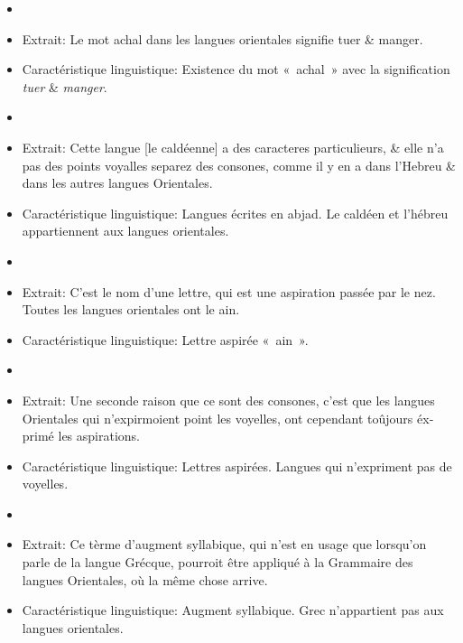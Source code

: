 \documentclass[output=paper,colorlinks,citecolor=brown,arabicfont,chinesefont,booklanguage=french]{langscibook}
\begin{document}
\begin{otherlanguage}{french}
\begin{description}[font=\normalfont]
\item[ACHAL] 
    \begin{itemize}[leftmargin=*]
        \item[]
        \item Extrait: Le mot achal dans les langues orientales signifie tuer \& manger. 
        \item Caractéristique linguistique: Existence du mot «~achal~» avec la signification \emph{tuer} \& \emph{manger}.
    \end{itemize}        
\item[ABYSSINS] 
    \begin{itemize}[leftmargin=*]
        \item[]
        \item Extrait: Cette langue [le caldéenne] a des caracteres particulieurs, \& elle n’a pas des points voyalles separez des consones, comme il y en a dans l’Hebreu \& dans les autres langues Orientales. 
        \item Caractéristique linguistique: Langues écrites en abjad. Le caldéen et l’hébreu appartiennent aux langues orientales.
    \end{itemize}        
\item[AIN] 
    \begin{itemize}[leftmargin=*]
        \item[]
        \item Extrait: C’est le nom d’une lettre, qui est une aspiration passée par le nez. Toutes les langues orientales ont le ain. 
        \item Caractéristique linguistique: Lettre aspirée «~ain~». 
    \end{itemize}        
\item[ASPIRATION]
    \begin{itemize}[leftmargin=*]
        \item[]
        \item Extrait: Une seconde raison que ce sont des consones, c’est que les langues Orientales qui n’expirmoient point les voyelles, ont cependant toûjours éxprimé les aspirations. 
        \item Caractéristique linguistique: Lettres aspirées. Langues qui n’expriment pas de voyelles. 
    \end{itemize}
\newpage
\item[AUGMENT] 
    \begin{itemize}[leftmargin=*]
       \item[]
        \item Extrait: Ce tèrme d’augment syllabique, qui n’est en usage que lorsqu’on parle de la langue Grécque, pourroit être appliqué à la Grammaire des langues Orientales, où la même chose arrive. 
       \item Caractéristique linguistique: Augment syllabique. Grec n’appartient pas aux langues orientales. 
    \end{itemize}       
\end{description}

{\sloppy\printbibliography[heading=subbibliography,notkeyword=this]}
\end{otherlanguage}
\end{document}
